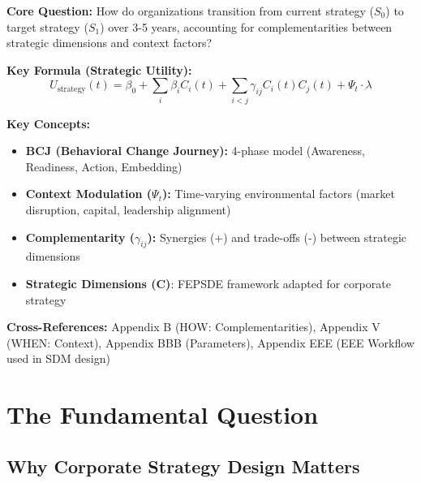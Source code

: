 \begin{tcolorbox}[colback=blue!5!white, colframe=blue!75!black,
    title=Quick Reference: Strategy Design Model v1.0]

\textbf{Core Question:} How do organizations transition from current strategy ($S_0$) to target strategy ($S_1$) over 3-5 years, accounting for complementarities between strategic dimensions and context factors?

\textbf{Key Formula (Strategic Utility):}
\begin{equation}
U_{\text{strategy}}(t) = \beta_0 + \sum_{i} \beta_i C_i(t) + \sum_{i<j} \gamma_{ij} C_i(t) C_j(t) + \Psi_t \cdot \lambda
\end{equation}

\textbf{Key Concepts:}
\begin{itemize}[nosep]
\item \textbf{BCJ (Behavioral Change Journey):} 4-phase model (Awareness, Readiness, Action, Embedding)
\item \textbf{Context Modulation ($\Psi_t$):} Time-varying environmental factors (market disruption, capital, leadership alignment)
\item \textbf{Complementarity ($\gamma_{ij}$):} Synergies (+) and trade-offs (-) between strategic dimensions
\item \textbf{Strategic Dimensions (C)}: FEPSDE framework adapted for corporate strategy
\end{itemize}

\textbf{Cross-References:} Appendix B (HOW: Complementarities), Appendix V (WHEN: Context), Appendix BBB (Parameters), Appendix EEE (EEE Workflow used in SDM design)

\end{tcolorbox}


\section{The Fundamental Question}
\label{sec:sdm-fundamental}

\subsection{Why Corporate Strategy Design Matters}

